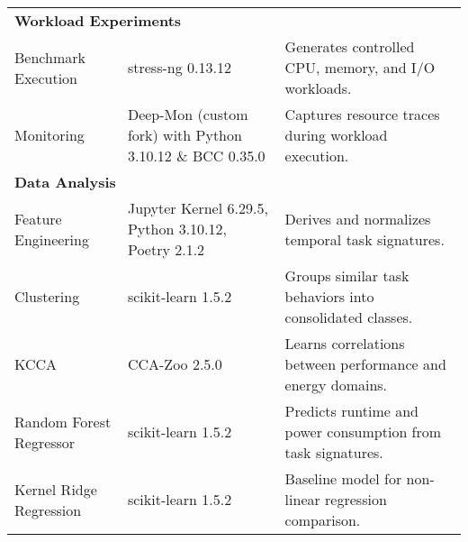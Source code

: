 \begin{table}[H]
{\begin{tabular}{
            p{4.5cm}
            >{\centering\arraybackslash}p{2.8cm}
            p{8.2cm}
            }
            \midrule
            \multicolumn{3}{l}{\textbf{Workload Experiments}}                                                                                                                                                                       \\[3pt]
            Benchmark Execution         & stress-ng 0.13.12                                        & Generates controlled CPU, memory, and I/O workloads.                                                                           \\
            Monitoring                  & Deep-Mon (custom fork) with Python 3.10.12 \& BCC 0.35.0 & Captures resource traces during workload execution.                                                                            \\

            \midrule
            \multicolumn{3}{l}{\textbf{Data Analysis}}                                                                                                                                                                              \\[3pt]
            Feature Engineering         & Jupyter Kernel 6.29.5, Python 3.10.12, Poetry 2.1.2      & Derives and normalizes temporal task signatures.                                                                               \\
            Clustering                  & scikit-learn 1.5.2                                       & Groups similar task behaviors into consolidated classes.                                                                       \\
            KCCA                        & CCA-Zoo 2.5.0                                            & Learns correlations between performance and energy domains.                                                                    \\
            Random Forest Regressor     & scikit-learn 1.5.2                                       & Predicts runtime and power consumption from task signatures.                                                                   \\
            Kernel Ridge Regression     & scikit-learn 1.5.2                                       & Baseline model for non-linear regression comparison.                                                                           \\


\end{tabular}}
\end{table}
